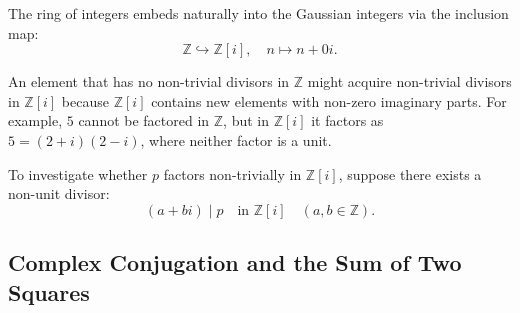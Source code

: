 \begin{content}
The ring of integers embeds naturally into the Gaussian integers via the inclusion map:
\[
\mathbb{Z} \hookrightarrow \mathbb{Z}[i], \quad n \mapsto n + 0i.
\]


\begin{steps}
An element that has no non-trivial divisors in $\mathbb{Z}$ might acquire non-trivial divisors in $\mathbb{Z}[i]$ because $\mathbb{Z}[i]$ contains new elements with non-zero imaginary parts. For example, $5$ cannot be factored in $\mathbb{Z}$, but in $\mathbb{Z}[i]$ it factors as $5 = (2 + i)(2 - i)$, where neither factor is a unit.
\end{steps}

\par\vspace{1ex}\noindent
To investigate whether $p$ factors non-trivially in $\mathbb{Z}[i]$, suppose there exists a non-unit divisor:
\begin{equation}\label{eq:gaussian-divisor}
(a + bi) \mid p \quad \text{in } \mathbb{Z}[i] \quad (a, b \in \mathbb{Z}).
\end{equation}
\end{content}

\subsection{Complex Conjugation and the Sum of Two Squares}

